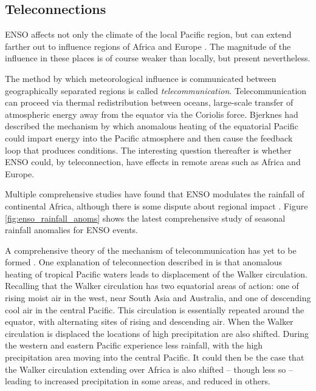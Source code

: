 \subsection{Teleconnections}
ENSO affects not only the climate of the local Pacific region, but can extend
farther out to influence regions of Africa and Europe \citep{moron1998}. The
magnitude of the influence in these places is of course weaker than locally, but
present nevertheless.

The method by which meteorological influence is communicated between
geographically separated regions is called
\emph{telecommunication}. Telecommunication can proceed via thermal
redistribution between oceans, large-scale transfer of atmospheric energy away
from the equator via the Coriolis force. Bjerknes had described the mechanism by
which anomalous heating of the equatorial Pacific could impart energy into the
Pacific atmosphere and then cause the feedback loop that produces \elnino{}
conditions. The interesting question thereafter is whether ENSO could, by
teleconnection, have effects in remote areas such as Africa and Europe.

Multiple comprehensive studies \citep{ropelewski1987, ropelewski1989,
  nicholson1996} have found that ENSO modulates the rainfall of continental
Africa, although there is some dispute about regional impact
\citep{wolter1989}. Figure \ref{fig:enso_rainfall_anoms} shows the latest
comprehensive study of seasonal rainfall anomalies for ENSO events.

A comprehensive theory of the mechanism of telecommunication has yet to be formed
\citep{philander1990}. One explanation of teleconnection described in
\cite{joly2009} is that anomalous heating of tropical Pacific waters leads to
displacement of the Walker circulation. Recalling that the Walker circulation
has two equatorial areas of action: one of rising moist air in the west, near
South Asia and Australia, and one of descending cool air in the central
Pacific. This circulation is essentially repeated around the equator, with
alternating sites of rising and descending air. When the Walker circulation is
displaced the locations of high precipitation are also shifted. During \elnino{}
the western and eastern Pacific experience less rainfall, with the high
precipitation area moving into the central Pacific. It could then be the case
that the Walker circulation extending over Africa is also shifted -- though less
so -- leading to increased precipitation in some areas, and reduced in others.

